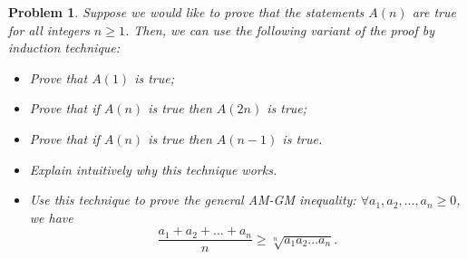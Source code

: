 \documentclass[a4paper, 12pt]{article}
\theoremstyle{plain}
\newtheorem{problem}{Problem}
\begin{document}
\begin{problem}
    Suppose we would like to prove that the statements $A(n)$ are true for all integers $n \geqslant 1$. Then, we can use the following variant of the proof by induction technique:
    \begin{itemize}
        \item[--] Prove that $A(1)$ is true;
        \item[--] Prove that if $A(n)$ is true then $A(2n)$ is true;
        \item[--] Prove that if $A(n)$ is true then $A(n-1)$ is true.
    \end{itemize}
    \begin{itemize}
        \item[(a)] Explain intuitively why this technique works.
        \item[(b)]
            Use this technique to prove the general AM-GM inequality: $\forall a_1, a_2, ..., a_n \geqslant 0$, we have
            \[ \frac{a_1 + a_2 + ... + a_n}{n} \geqslant \sqrt[n]{a_1 a_2 ... a_n}. \] 
    \end{itemize}
\end{problem}
\end{document}
